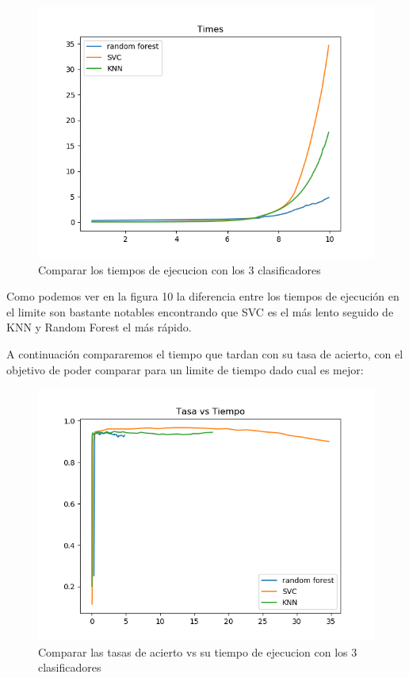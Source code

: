 \documentclass[8pt,a4paper]{article}
\begin{document}
\begin{figure}[htbp]
    \centering
    \includegraphics[width=\textwidth]{./CompararTiempos.png}
    \caption{Comparar los tiempos de ejecucion con los 3 clasificadores}
\end{figure}

Como podemos ver en la figura 10 la diferencia entre los tiempos de ejecución en el limite son bastante notables encontrando que SVC es el más lento seguido de KNN y Random Forest el más rápido.

A continuación compararemos el tiempo que tardan con su tasa de acierto, con el objetivo de poder comparar para un limite de tiempo dado cual es mejor:
\begin{figure}[htbp]
    \centering
    \includegraphics[width=\textwidth]{./CompararAciertosvsTiempos.png}
    \caption{Comparar las tasas de acierto vs su tiempo de ejecucion con los 3 clasificadores}
\end{figure}
\end{document}

